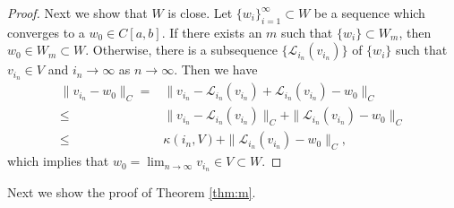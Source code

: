 \documentclass[11pt]{article}
\begin{document}
\begin{proof}
Next we show that $W$ is close. Let $\{w_{i}\}_{i=1}^{\infty}\subset W$ be a sequence which converges to a $w_{0}\in C[a,b]$. If there exists an $m$ such that $\{w_{i}\}\subset W_{m}$, then $w_{0}\in W_{m}\subset W$. Otherwise, there is a subsequence $\{\mathcal{L}_{i_{n}}(v_{i_{n}})\}$ of $\{w_{i}\}$ such that $v_{i_{n}}\in V$ and $i_{n}\rightarrow\infty$ as $n\rightarrow\infty$. Then we have
\begin{equation*}
\begin{split}
    \|v_{i_{n}}-w_{0}\|_{C}=&\|v_{i_{n}}-\mathcal{L}_{i_{n}}(v_{i_{n}})+\mathcal{L}_{i_{n}}(v_{i_{n}})-w_{0}\|_{C} \\ 
    \leq&\|v_{i_{n}}-\mathcal{L}_{i_{n}}(v_{i_{n}})\|_{C}+\|\mathcal{L}_{i_{n}}(v_{i_{n}})-w_{0}\|_{C} \\
    \leq&\kappa(i_{n},V)+\|\mathcal{L}_{i_{n}}(v_{i_{n}})-w_{0}\|_{C},
\end{split}
\end{equation*}
which implies that $w_{0}=\lim_{n\rightarrow\infty}v_{i_{n}}\in V\subset W$.
\end{proof}
Next we show the proof of Theorem \ref{thm:m}.
\end{document}
